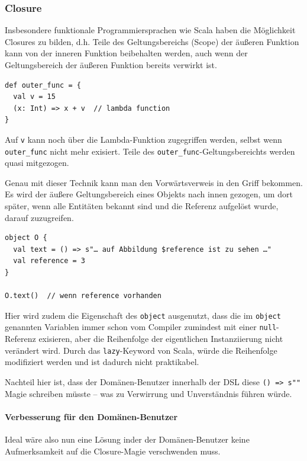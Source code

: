 \subsubsection{Closure}\label{sec-closure}

Insbesondere funktionale Programmiersprachen wie Scala haben die
Möglichkeit Closures zu bilden, d.h. Teile des Geltungsbereichs (Scope)
der äußeren Funktion kann von der inneren Funktion beibehalten werden,
auch wenn der Geltungsbereich der äußeren Funktion bereits verwirkt ist.

\begin{lstlisting}
def outer_func = {
  val v = 15
  (x: Int) => x + v  // lambda function
}
\end{lstlisting}

Auf \lstinline|v| kann noch über die Lambda-Funktion zugegriffen werden,
selbst wenn \lstinline|outer_func| nicht mehr exisiert. Teile des
\lstinline|outer_func|-Geltungsbereichts werden quasi mitgezogen.

Genau mit dieser Technik kann man den Vorwärtsverweis in den Griff bekommen.
Es wird der äußere Geltungsbereich eines Objekts nach innen gezogen,
um dort später, wenn alle Entitäten bekannt sind und die Referenz aufgelöst
wurde, darauf zuzugreifen.

\begin{lstlisting}
object O {
  val text = () => s"… auf Abbildung $reference ist zu sehen …"
  val reference = 3
}

O.text()  // wenn reference vorhanden
\end{lstlisting}

Hier wird zudem die Eigenschaft des \lstinline|object| ausgenutzt,
dass die im \lstinline|object| genannten Variablen immer schon vom Compiler
zumindest mit einer \lstinline|null|-Referenz exisieren, aber die Reihenfolge
der eigentlichen Instanziierung nicht verändert wird. Durch das
\lstinline|lazy|-Keyword von Scala, würde die Reihenfolge modifiziert werden
und ist dadurch nicht praktikabel.

Nachteil hier ist, dass der Domänen-Benutzer innerhalb der DSL diese
\lstinline|() => s""| Magie schreiben müsste -- was zu Verwirrung und
Unverständnis führen würde.


\paragraph{Verbesserung für den Domänen-Benutzer}

Ideal wäre also nun eine Lösung inder der Domänen-Benutzer keine
Aufmerksamkeit auf die Closure-Magie verschwenden muss.

